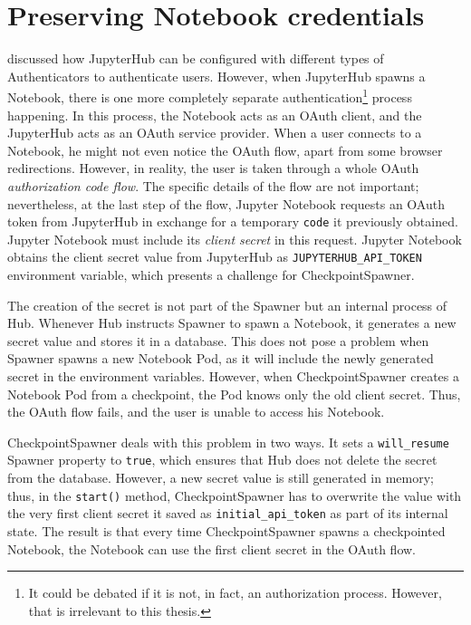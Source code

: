 \documentclass[
  digital,     %
  oneside,     %
  nosansbold,  %
  nocolorbold, %
  lof,         %
  nolot,         %
]{fithesis4}
\begin{document}
\section{Preserving Notebook credentials}
 discussed how JupyterHub can be configured with different types of Authenticators to authenticate users. However, when JupyterHub spawns a Notebook, there is one more completely separate authentication\footnote{It could be debated if it is not, in fact, an authorization process. However, that is irrelevant to this thesis.} process happening. In this process, the Notebook acts as an OAuth client, and the JupyterHub acts as an OAuth service provider. When a user connects to a Notebook, he might not even notice the OAuth flow, apart from some browser redirections. However, in reality, the user is taken through a whole OAuth \emph{authorization code flow}. The specific details of the flow are not important; nevertheless, at the last step of the flow, Jupyter Notebook requests an OAuth token from JupyterHub in exchange for a temporary \texttt{code} it previously obtained. Jupyter Notebook must include its \emph{client secret} in this request. Jupyter Notebook obtains the client secret value from JupyterHub as \texttt{JUPYTERHUB\_API\_TOKEN} environment variable, which presents a challenge for CheckpointSpawner.

The creation of the secret is not part of the Spawner but an internal process of Hub. Whenever Hub instructs Spawner to spawn a Notebook, it generates a new secret value and stores it in a database. This does not pose a problem when Spawner spawns a new Notebook Pod, as it will include the newly generated secret in the environment variables. However, when CheckpointSpawner creates a Notebook Pod from a checkpoint, the Pod knows only the old client secret. Thus, the OAuth flow fails, and the user is unable to access his Notebook.

CheckpointSpawner deals with this problem in two ways. It sets a \texttt{will\_resume} Spawner property to \texttt{true}, which ensures that Hub does not delete the secret from the database. However, a new secret value is still generated in memory; thus, in the \texttt{start()} method, CheckpointSpawner has to overwrite the value with the very first client secret it saved as \texttt{initial\_api\_token} as part of its internal state. The result is that every time CheckpointSpawner spawns a checkpointed Notebook, the Notebook can use the first client secret in the OAuth flow.
\end{document}
